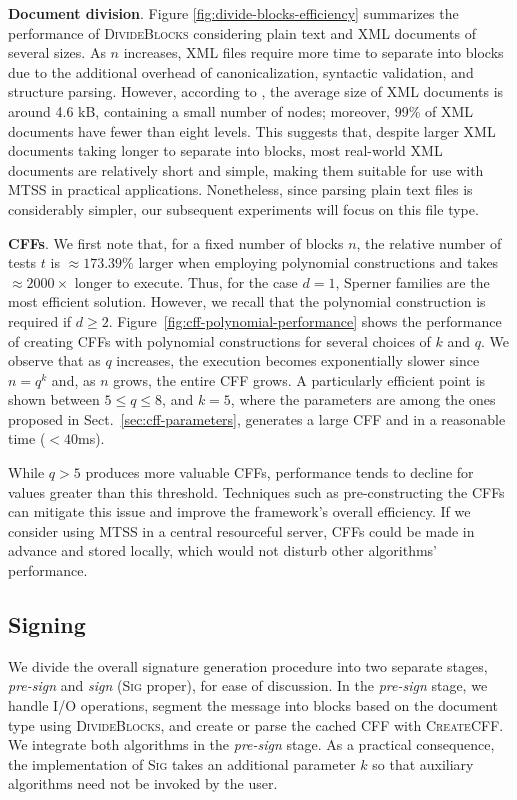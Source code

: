 \documentclass[12pt]{article}
\begin{document}
\textbf{Document division}. Figure \ref{fig:divide-blocks-efficiency} summarizes the performance of \textsc{DivideBlocks} considering plain text and XML documents of several sizes. As $n$ increases, XML files require more time to separate into blocks due to the additional overhead of canonicalization, syntactic validation, and structure parsing. However, according to \cite{xml-statistics-mlynkova-2006}, the average size of XML documents is around 4.6 kB, containing a small number of nodes; moreover, 99\% of XML documents have fewer than eight levels. This suggests that, despite larger XML documents taking longer to separate into blocks, most real-world XML documents are relatively short and simple, making them suitable for use with MTSS in practical applications. Nonetheless, since parsing plain text files is considerably simpler, our subsequent experiments will focus on this file type.

\textbf{CFFs}. We first note that, for a fixed number of blocks $n$, the relative number of tests $t$ is $\approx 173.39\%$ larger when employing polynomial constructions and takes $\approx 2000 \times$ longer to execute. Thus, for the case $d = 1$, Sperner families are the most efficient solution. However, we recall that the polynomial construction is required if $d \geq 2$. Figure~\ref{fig:cff-polynomial-performance} shows the performance of creating CFFs with polynomial constructions for several choices of $k$ and $q$. We observe that as $q$ increases, the execution becomes exponentially slower since $n = q^k$ and, as $n$ grows, the entire CFF grows. A particularly efficient point is shown between $5 \leq q \leq 8$, and $k = 5$, where the parameters are among the ones proposed in Sect.~\ref{sec:cff-parameters}, generates a large CFF and in a reasonable time ($< 40$ms).

While $q > 5$ produces more valuable CFFs, performance tends to decline for values greater than this threshold. Techniques such as pre-constructing the CFFs can mitigate this issue and improve the framework's overall efficiency. If we consider using MTSS in a central resourceful server, CFFs could be made in advance and stored locally, which would not disturb other algorithms' performance.

\subsection{Signing}
\label{sec:signature}

We divide the overall signature generation procedure into two separate stages, \textit{pre-sign} and \textit{sign} (\textsc{Sig} proper), for ease of discussion. In the \textit{pre-sign} stage, we handle I/O operations, segment the message into blocks based on the document type using \textsc{DivideBlocks}, and create or parse the cached CFF with \textsc{CreateCFF}. We integrate both algorithms in the \textit{pre-sign} stage. As a practical consequence, the implementation of \textsc{Sig} takes an additional parameter $k$ so that auxiliary algorithms need not be invoked by the user.
\end{document}
